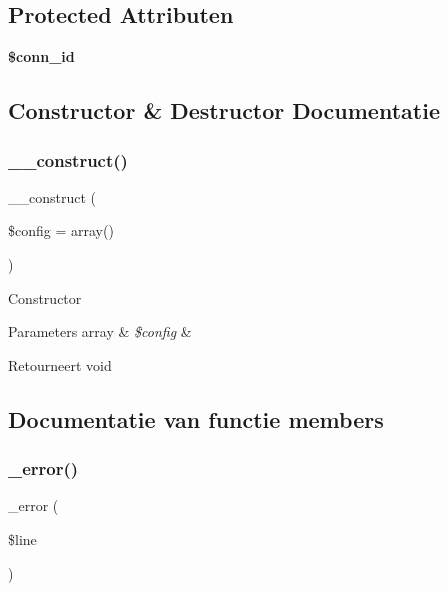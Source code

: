\subsection*{Protected Attributen}
\begin{DoxyCompactItemize}
\item 
\mbox{\label{class_c_i___f_t_p_a16c23f1dcbfed2f2759f5e54f604106d}} 
{\bfseries \$conn\+\_\+id}
\end{DoxyCompactItemize}


\subsection{Constructor \& Destructor Documentatie}
\mbox{\label{class_c_i___f_t_p_af7f9493844d2d66e924e3c1df51ce616}} 
\subsubsection{\texorpdfstring{\_\_construct()}{\_\_construct()}}
{\footnotesize\ttfamily \+\_\+\+\_\+construct (\begin{DoxyParamCaption}\item[{}]{\$config = {\ttfamily array()} }\end{DoxyParamCaption})}

Constructor


\begin{DoxyParams}[1]{Parameters}
array & {\em \$config} & \\
\hline
\end{DoxyParams}
\begin{DoxyReturn}{Retourneert}
void 
\end{DoxyReturn}


\subsection{Documentatie van functie members}
\mbox{\label{class_c_i___f_t_p_ac618e7d56614851d2c54aa096e1bcace}} 
\subsubsection{\texorpdfstring{\_error()}{\_error()}}
{\footnotesize\ttfamily \+\_\+error (\begin{DoxyParamCaption}\item[{}]{\$line }\end{DoxyParamCaption})\hspace{0.3cm}{\ttfamily [protected]}}

